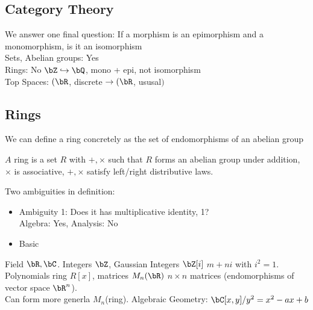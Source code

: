 
\subsection{Category Theory} 

We answer one final question: If a morphism is an epimorphism and a monomorphism, is it an isomorphism \\
Sets, Abelian groups: Yes \\ 
Rings: No \quad $\bZ \hookrightarrow \bQ$, mono + epi, not isomorphism \\
Top Spaces: $(\bR$, discrete $\to (\bR$, ususal$)$ 

\subsection{Rings} 

We can define a ring concretely as the set of endomorphisms of an abelian group 

\begin{definition}
    $A$ ring is a set $R$ with $+ , \times$ such that $R$ forms an abelian group under addition, $\times$ is associative, $+, \times$ satisfy left/right distributive laws. 
\end{definition}

\noindent
Two ambiguities in definition: 
\begin{itemize}
    \item Ambiguity 1: Does it has multiplicative identity, 1? \\
    Algebra: Yes, Analysis: No 
    \item Basic 
\end{itemize}

\begin{example}
    Field $\bR, \bC$. Integers $\bZ$, Gaussian Integers $\bZ[i]$ $m+ni$ with $i^2=1$. \\
    Polynomials ring $R[x]$, matrices $M_n(\bR)$ $n \times n$ matrices (endomorphisms of vector space $\bR^n$). \\
    Can form more generla $M_n$(ring). Algebraic Geometry: $\bC[x,y]/y^2 = x^2-ax+b$ 
\end{example}

